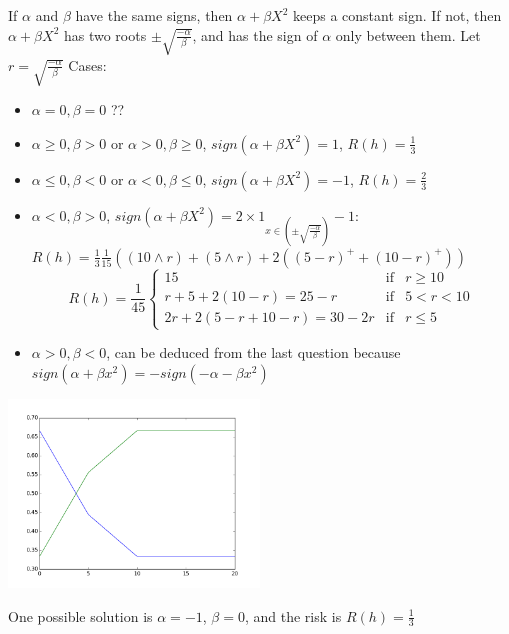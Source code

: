 \documentclass[11pt]{article}
\begin{document}
If \(\alpha\) and \(\beta\) have the same signs, then \(\alpha + \beta X^2\) keeps a constant sign.
If not, then \(\alpha + \beta X^2\) has two roots \(\pm \sqrt{\frac{-\alpha}{\beta}}\), and has the sign of \(\alpha\) only between them. Let \(r = \sqrt{\frac{-\alpha}{\beta}}\)
Cases:
\begin{itemize}
\item \(\alpha = 0, \beta = 0\) ??
\item \(\alpha \ge 0, \beta > 0\) or \(\alpha > 0, \beta \ge 0\), \(sign(\alpha + \beta X^2)  = 1\), \(R(h) = \frac13\)
\item \(\alpha \le 0, \beta < 0\) or \(\alpha < 0, \beta \le 0\), \(sign(\alpha + \beta X^2)  = -1\), \(R(h) = \frac23\)
\item \(\alpha < 0, \beta > 0\), \(sign(\alpha + \beta X^2) = 2 \times 1_{x \in (\pm \sqrt{\frac{-\alpha}{\beta}})} - 1\):
\(R(h) = \frac13 \frac{1}{15} \left( (10 \wedge r)+ (5 \wedge r) + 2( (5-r)^+ + (10-r)^+)   \right)\)
\[R(h) = \frac1{45}\left\{\begin{array}{ccc}15 &\text{if} & r \ge 10\\ r +5 + 2(10-r)=25-r &\text{if} & 5 < r < 10\\  2r+2(5-r + 10-r) = 30 - 2r &\text{if} & r \le 5 \end{array} \right.\]

\item \(\alpha > 0, \beta < 0\), can be deduced from the last question because \(sign(\alpha + \beta x^2) = - sign(-\alpha - \beta x^2)\)
\end{itemize}

\begin{org}
\begin{center}
\includegraphics[width=0.5\textwidth]{img/bayeserror1.png}
\end{center}
\end{org}

One possible solution is \(\alpha = -1\), \(\beta = 0\), and the risk is \(R(h) = \frac13\)
\end{document}
